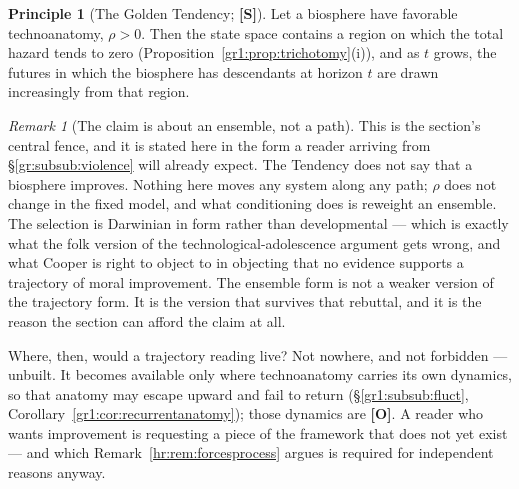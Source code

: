 \documentclass[11pt]{article}
\numberwithin{equation}{section}
\theoremstyle{plain}
\theoremstyle{definition}
\newtheorem{principle}{Principle}
\theoremstyle{remark}
\newtheorem{remark}[theorem]{Remark}
\begin{document}
\begin{principle}[The Golden Tendency; \textbf{[S]}]\label{ac:prin:tendency}
Let a biosphere have favorable technoanatomy, $\rho > 0$. Then the state space contains a region on which the total hazard tends to zero (Proposition~\ref{gr1:prop:trichotomy}(i)), and as $t$ grows, the futures in which the biosphere has descendants at horizon $t$ are drawn increasingly from that region.
\end{principle}

\begin{remark}[The claim is about an ensemble, not a path]\label{ac:rem:notrajectory}
This is the section's central fence, and it is stated here in the form a reader arriving from \S\ref{gr:subsub:violence} will already expect. The Tendency does not say that a biosphere improves. Nothing here moves any system along any path; $\rho$ does not change in the fixed model, and what conditioning does is reweight an ensemble. The selection is Darwinian in form rather than developmental --- which is exactly what the folk version of the technological-adolescence argument gets wrong, and what Cooper \cite{Cooper19} is right to object to in objecting that no evidence supports a trajectory of moral improvement. The ensemble form is not a weaker version of the trajectory form. It is the version that survives that rebuttal, and it is the reason the section can afford the claim at all.

Where, then, would a trajectory reading live? Not nowhere, and not forbidden --- unbuilt. It becomes available only where technoanatomy carries its own dynamics, so that anatomy may escape upward and fail to return (\S\ref{gr1:subsub:fluct}, Corollary~\ref{gr1:cor:recurrentanatomy}); those dynamics are \textbf{[O]}. A reader who wants improvement is requesting a piece of the framework that does not yet exist --- and which Remark~\ref{hr:rem:forcesprocess} argues is required for independent reasons anyway.
\end{remark}
\end{document}
